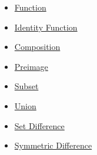 \begin{dependencies}
\begin{itemize}
  \item \hyperref[def:function]{Function}
  \item \hyperref[def:identity]{Identity Function}
  \item \hyperref[def:composition]{Composition}
  \item \hyperref[def:preimage]{Preimage}
  \item \hyperref[def:subset]{Subset}
  \item \hyperref[def:union]{Union}
  \item \hyperref[def:set-difference]{Set Difference}
  \item \hyperref[def:sym-diff]{Symmetric Difference}
\end{itemize}
\end{dependencies}

\clearpage
